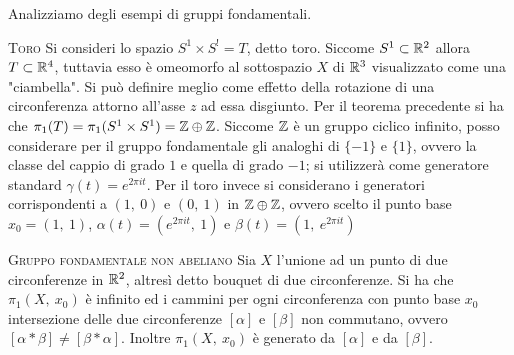 Analizziamo degli esempi di gruppi fondamentali.
\begin{example} \textsc{Toro}
	Si consideri lo spazio $S^1\times S^! =T$, detto toro. Siccome $S^1\subset\mathbb{R}^2$ allora $T\subset \mathbb{R}^4$, tuttavia esso è omeomorfo al sottospazio $X$ di $\mathbb{R}^3$ visualizzato come una "ciambella". Si può definire meglio come effetto della rotazione di una circonferenza attorno all'asse $z$ ad essa disgiunto.\newline
	Per il teorema precedente si ha che $\pi_1(T)=\pi_1(S^1\times S^1)=\mathbb{Z}\oplus\mathbb{Z}$. Siccome $\mathbb{Z}$ è un gruppo ciclico infinito, posso considerare per il gruppo fondamentale gli analoghi di $\{-1\}$ e $\{1\}$, ovvero la classe del cappio di grado $1$ e quella di grado $-1$; si utilizzerà come generatore standard $\gamma(t)=e^{2\pi i t}$. Per il toro invece si considerano i generatori corrispondenti a $(1,\ 0)$ e $(0,\ 1)$ in $\mathbb{Z}\oplus\mathbb{Z}$, ovvero scelto il punto base $x_0=(1,\ 1)$, $\alpha(t)=(e^{2\pi i t},\ 1)$ e $\beta(t)=(1,\ e^{2\pi i t})$
\end{example}
\begin{example}\textsc{Gruppo fondamentale non abeliano}
	Sia $X$ l'unione ad un punto di due circonferenze in $\mathbb{R}^2$, altresì detto bouquet di due circonferenze. Si ha che $\pi_1(X,\ x_0)$ è infinito ed i cammini per ogni circonferenza con punto base $x_0$ intersezione delle due circonferenze  $[\alpha]$ e $[\beta]$ non commutano, ovvero $[\alpha\ast\beta]\neq [\beta\ast\alpha]$. Inoltre $\pi_1(X,\ x_0)$ è generato da $[\alpha]$ e da $[\beta]$.
\end{example}	

